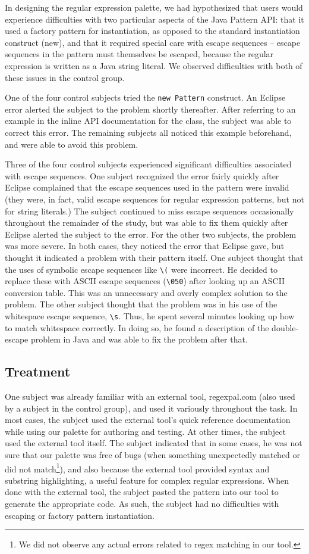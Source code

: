 \documentclass[10pt, conference, compsocconf]{IEEEtran}
\begin{document}
In designing the regular expression palette, we had hypothesized that users would experience difficulties with two particular aspects of the Java Pattern API: that it used a factory pattern for instantiation, as opposed to the standard instantiation construct (new), and that it required special care with escape sequences -- escape sequences in the pattern must themselves be escaped, because the regular expression is written as a Java string literal. We observed difficulties with both of these issues in the control group. 

One of the four control subjects tried the \verb|new Pattern| construct. An Eclipse error alerted the subject to the problem shortly thereafter. After referring to an example in the inline API documentation for the class, the subject was able to correct this error. The remaining subjects all noticed this example beforehand, and were able to avoid this problem.

Three of the four control subjects experienced significant difficulties associated with escape sequences. One subject recognized the error fairly quickly after Eclipse complained that the escape sequences used in the pattern were invalid (they were, in fact, valid escape sequences for regular expression patterns, but not for string literals.) The subject continued to miss escape sequences occasionally throughout the remainder of the study, but was able to fix them quickly after Eclipse alerted the subject to the error. For the other two subjects, the problem was more severe. In both cases, they noticed the error that Eclipse gave, but thought it indicated a problem with their pattern itself. One subject thought that the uses of symbolic escape sequences like \verb|\(| were incorrect. He decided to replace these with ASCII escape sequences (\verb|\050|) after looking up an ASCII conversion table. This was an unnecessary and overly complex solution to the problem. The other subject thought that the problem was in his use of the whitespace escape sequence, \verb|\s|. Thus, he  spent several minutes looking up how to match whitespace correctly. In doing so, he found a description of the double-escape problem in Java and was able to fix the problem after that.
\subsection{Treatment}
One subject was already familiar with an external tool, regexpal.com (also used by a subject in the control group), and used it variously throughout the task. In most cases, the subject used the external tool's quick reference documentation while using our palette for authoring and testing. At other times, the subject used the external tool itself. The subject indicated that in some cases, he was not sure that our palette was free of bugs (when something unexpectedly matched or did not match\footnote{We did not observe any actual errors related to regex matching in our tool.}), and also because the external tool provided syntax and substring highlighting, a useful feature for complex regular expressions. When done with the external tool, the subject pasted the pattern into our tool to generate the appropriate code. As such, the subject had no difficulties with escaping or factory pattern instantiation.
\end{document}
